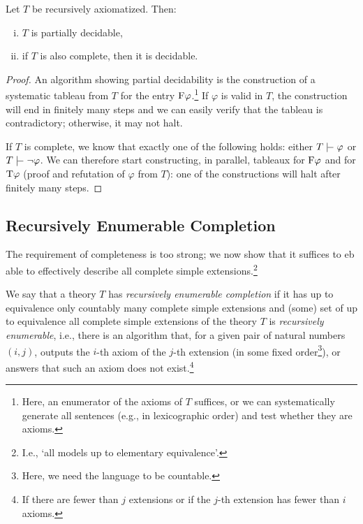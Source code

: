 \begin{proposition}
    Let $T$ be recursively axiomatized. Then:
    \begin{enumerate}[(i)]
        \item $T$ is partially decidable,
        \item if $T$ is also complete, then it is decidable.
    \end{enumerate}
\end{proposition}
\begin{proof}
An algorithm showing partial decidability is the construction of a systematic tableau from $T$ for the entry $\mathrm{F} \varphi$.\footnote{Here, an enumerator of the axioms of $T$ suffices, or we can systematically generate all sentences (e.g., in lexicographic order) and test whether they are axioms.} If $\varphi$ is valid in $T$, the construction will end in finitely many steps and we can easily verify that the tableau is contradictory; otherwise, it may not halt.

If $T$ is complete, we know that exactly one of the following holds: either $T \proves \varphi$ or $T \proves \neg \varphi$. We can therefore start constructing, in parallel, tableaux for $\mathrm{F} \varphi$ and for $\mathrm{T} \varphi$ (proof and refutation of $\varphi$ from $T$): one of the constructions will halt after finitely many steps.
\end{proof}


\subsection{Recursively Enumerable Completion}

The requirement of completeness is too strong; we now show that it suffices to eb able to effectively describe all complete simple extensions.\footnote{I.e., `all models up to elementary equivalence'.}

\begin{definition}
We say that a theory $T$ has \emph{recursively enumerable completion} if it has up to equivalence only countably many complete simple extensions and (some) set of up to equivalence all complete simple extensions of the theory $T$ is \emph{recursively enumerable}, i.e., there is an algorithm that, for a given pair of natural numbers $(i,j)$, outputs the $i$-th axiom of the $j$-th extension (in some fixed order\footnote{Here, we need the language to be countable.}), or answers that such an axiom does not exist.\footnote{If there are fewer than $j$ extensions or if the $j$-th extension has fewer than $i$ axioms.}
\end{definition}

